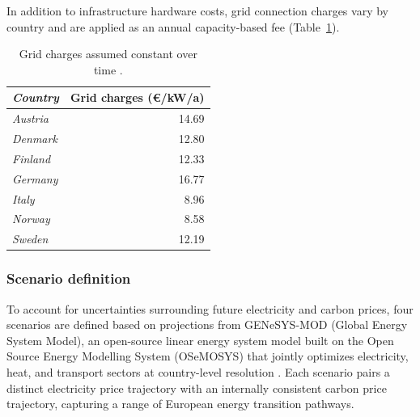             In addition to infrastructure hardware costs, grid connection charges vary by country and are applied as an annual capacity-based fee (Table~\ref{tab:elec_networkfees}).

    \begin{table}[H]
    \centering
    \caption{Grid charges assumed constant over time \citep{Lanz2022}.}
    \label{tab:elec_networkfees}
    \begin{tabular}{@{}lr@{}}
    \toprule
    \textit{Country} & \textbf{Grid charges (\euro/kW/a)} \\ \midrule
    \textit{Austria}  & 14.69 \\
    \textit{Denmark}  & 12.80 \\
    \textit{Finland}  & 12.33 \\
    \textit{Germany}  & 16.77 \\
    \textit{Italy}    & 8.96  \\
    \textit{Norway}   & 8.58  \\
    \textit{Sweden}   & 12.19 \\ \bottomrule
    \end{tabular}
    \end{table}

    \subsubsection{Scenario definition}
        To account for uncertainties surrounding future electricity and carbon prices, four scenarios are defined based on projections from GENeSYS-MOD (Global Energy System Model), an open-source linear energy system model built on the Open Source Energy Modelling System (OSeMOSYS) that jointly optimizes electricity, heat, and transport sectors at country-level resolution \citep{Loffler2017GENeSYS}. Each scenario pairs a distinct electricity price trajectory with an internally consistent carbon price trajectory, capturing a range of European energy transition pathways.

